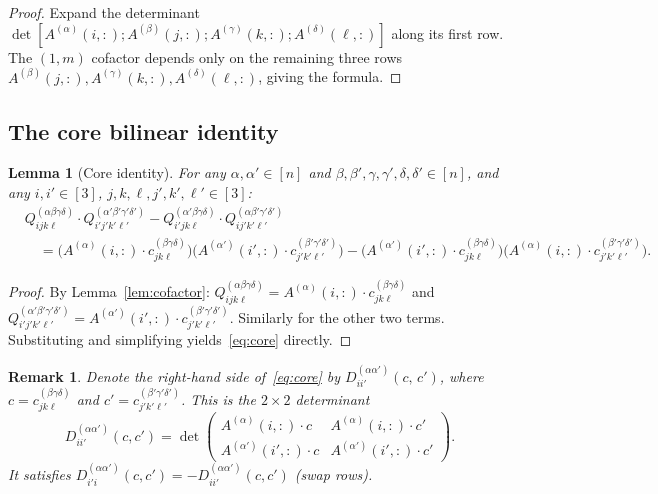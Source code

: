 \documentclass[12pt]{article}
\newtheorem{lemma}[theorem]{Lemma}
\newtheorem{remark}[theorem]{Remark}
\begin{document}
\begin{proof}
Expand the determinant $\det[A^{(\alpha)}(i,:);A^{(\beta)}(j,:);A^{(\gamma)}(k,:);A^{(\delta)}(\ell,:)]$
along its first row.  The $(1,m)$ cofactor depends only on the remaining three rows
$A^{(\beta)}(j,:),A^{(\gamma)}(k,:),A^{(\delta)}(\ell,:)$, giving the formula.
\end{proof}

\subsection{The core bilinear identity}

\begin{lemma}[Core identity]\label{lem:core}
For any $\alpha,\alpha'\in[n]$ and $\beta,\beta',\gamma,\gamma',\delta,\delta'\in[n]$,
and any $i,i'\in[3]$, $j,k,\ell,j',k',\ell'\in[3]$:
\begin{align}
  &Q^{(\alpha\beta\gamma\delta)}_{ijk\ell}\cdot Q^{(\alpha'\beta'\gamma'\delta')}_{i'j'k'\ell'}
  - Q^{(\alpha'\beta\gamma\delta)}_{i'jk\ell}\cdot Q^{(\alpha\beta'\gamma'\delta')}_{ij'k'\ell'}
  \nonumber\\
  &\quad =
  \bigl(A^{(\alpha)}(i,:)\cdot c^{(\beta\gamma\delta)}_{jk\ell}\bigr)
  \bigl(A^{(\alpha')}(i',:)\cdot c^{(\beta'\gamma'\delta')}_{j'k'\ell'}\bigr)
  -
  \bigl(A^{(\alpha')}(i',:)\cdot c^{(\beta\gamma\delta)}_{jk\ell}\bigr)
  \bigl(A^{(\alpha)}(i,:)\cdot c^{(\beta'\gamma'\delta')}_{j'k'\ell'}\bigr).
  \label{eq:core}
\end{align}
\end{lemma}

\begin{proof}
By Lemma~\ref{lem:cofactor}:
$Q^{(\alpha\beta\gamma\delta)}_{ijk\ell} = A^{(\alpha)}(i,:)\cdot c^{(\beta\gamma\delta)}_{jk\ell}$
and $Q^{(\alpha'\beta'\gamma'\delta')}_{i'j'k'\ell'} = A^{(\alpha')}(i',:)\cdot c^{(\beta'\gamma'\delta')}_{j'k'\ell'}$.
Similarly for the other two terms.  Substituting and simplifying yields~\eqref{eq:core} directly.
\end{proof}

\begin{remark}\label{rem:Ddef}
Denote the right-hand side of~\eqref{eq:core} by
$D^{(\alpha\alpha')}_{ii'}(c,\,c')$, where
$c = c^{(\beta\gamma\delta)}_{jk\ell}$ and $c' = c^{(\beta'\gamma'\delta')}_{j'k'\ell'}$.
This is the $2\times 2$ determinant
\[
  D^{(\alpha\alpha')}_{ii'}(c,c')
  = \det\begin{pmatrix}
      A^{(\alpha)}(i,:)\cdot c & A^{(\alpha)}(i,:)\cdot c' \\
      A^{(\alpha')}(i',:)\cdot c & A^{(\alpha')}(i',:)\cdot c'
    \end{pmatrix}.
\]
It satisfies $D^{(\alpha\alpha')}_{i'i}(c,c') = -D^{(\alpha\alpha')}_{ii'}(c,c')$ (swap rows).
\end{remark}
\end{document}
